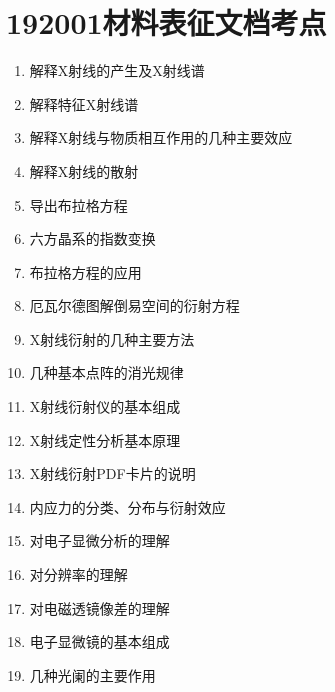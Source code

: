 \documentclass[12pt,a4paper]{article}
\begin{document}
    \section{192001材料表征文档考点}
    \begin{enumerate}
        \item 解释X射线的产生及X射线谱
        \item 解释特征X射线谱
        \item 解释X射线与物质相互作用的几种主要效应
        \item 解释X射线的散射
        \item 导出布拉格方程
        \item 六方晶系的指数变换
        \item 布拉格方程的应用
        \item 厄瓦尔德图解倒易空间的衍射方程
        \item X射线衍射的几种主要方法
        \item 几种基本点阵的消光规律
        \item X射线衍射仪的基本组成
        \item X射线定性分析基本原理
        \item X射线衍射PDF卡片的说明
        \item 内应力的分类、分布与衍射效应
        \item 对电子显微分析的理解
        \item 对分辨率的理解
        \item 对电磁透镜像差的理解
        \item 电子显微镜的基本组成
        \item 几种光阑的主要作用
    \end{enumerate}

    
\end{document}
